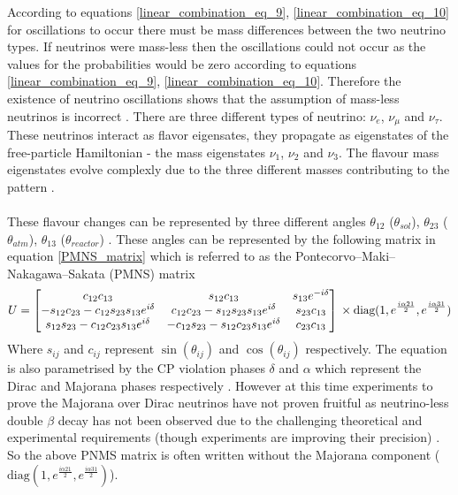 \documentclass[12pt,a4paper]{article}
\begin{document}
According to equations \ref{linear_combination_eq_9}, \ref{linear_combination_eq_10} for oscillations to occur there must be mass differences between the two neutrino types. If neutrinos were mass-less then the oscillations could not occur as the values for the probabilities would be zero according to equations \ref{linear_combination_eq_9}, \ref{linear_combination_eq_10}. Therefore the existence of neutrino oscillations shows that the assumption of mass-less neutrinos is incorrect \cite{griffiths2008book}\cite{griffiths2008neutrinoOscillations} \cite{sassaroli1999neutrino}. There are three different types of neutrino: $\nu_e$, $\nu_\mu$ and $\nu_\tau$. These neutrinos interact as flavor eigensates, they propagate as eigenstates of the free-particle Hamiltonian - the mass eigenstates $\nu_1$, $\nu_2$ and $\nu_3$. The flavour mass eigenstates evolve complexly due to the three different masses contributing to the pattern  \cite{griffiths2008book} \cite{griffiths2008neutrinoOscillations}. 
\\\\These flavour changes can be represented by three different angles $\theta_{12}$ ($\theta_{sol}$), $\theta_{23}$ ($\theta_{atm}$), $\theta_{13}$ ($\theta_{reactor}$) \cite{Olive_2014} \cite{griffiths2008book} \cite{griffiths2008neutrinoOscillations}. These angles can be represented by the following  matrix in equation \ref{PMNS_matrix} which is referred to as the Pontecorvo–Maki–Nakagawa–Sakata (PMNS) matrix
\begin{equation}
U
    =
    \begin{bmatrix}
        c_{12}c_{13} & s_{12}c_{13} & s_{13}e^{-i\delta}\\
        -s_{12}c_{23} - c_{12}s_{23}s_{13}e^{i\delta} & c_{12}c_{23} - s_{12}s_{23}s_{13}e^{i\delta} & s_{23}c_{13} \\
        s_{12}s_{23} - c_{12}c_{23}s_{13}e^{i\delta} & -c_{12}s_{23} - s_{12}c_{23}s_{13}e^{i\delta} & c_{23}c_{13} 
    \end{bmatrix}
    \\ \times \text{diag}(1, e^{\frac{i\alpha21}{2}} , e^{\frac{i\alpha31}{2}})
    \label{PMNS_matrix}
\end{equation}
Where $s_{ij}$ and $c_{ij}$ represent $\sin(\theta_{ij})$ and $\cos(\theta_{ij})$ respectively. The equation is also parametrised by the CP violation phases $\delta$ and $\alpha$ which represent the Dirac and Majorana phases respectively \cite{Olive_2014}. However at this time experiments to prove the Majorana over Dirac neutrinos have not proven fruitful as neutrino-less double $\beta$ decay has not been observed due to the challenging theoretical and experimental requirements (though experiments are improving their precision) \cite{Cardani_2019}.  So the above PNMS matrix is often written without the Majorana component ($\text{diag}(1, e^{\frac{i\alpha21}{2}} , e^{\frac{i\alpha31}{2}})$). 
\end{document}
